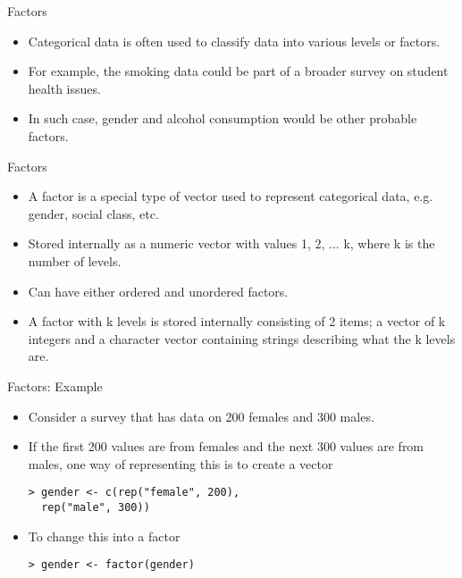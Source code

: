 \documentclass[pdf,default,slideColor,colorBG]{prosper}
\begin{document}
\begin{slide}{Factors}
\begin{itemize}
\item  Categorical data is often used to classify data into various levels or factors.
\item For example, the smoking data could be part of a broader survey on student health issues.
\item In such case, gender and alcohol consumption would be other probable factors.
\end{itemize}
\end{slide}
\begin{slide}{Factors}
\begin{itemize}
\item A factor is a special type of vector used to represent
categorical data, e.g. gender, social class, etc. \item Stored
internally as a numeric vector with values 1, 2, ... k, where k is
the number of levels. \item Can have either ordered and unordered
factors. \item A factor with k levels is stored internally
consisting of 2 items; a vector of k integers and a character
vector containing strings describing what the k levels are.
\end{itemize}
\end{slide}
\begin{slide}{Factors: Example}
\begin{itemize}
\item Consider a survey that has data on 200 females and 300
males. \item If the first 200 values are from females and the next 300
values are from males, one way of representing this is to create a
vector
\begin{verbatim}
> gender <- c(rep("female", 200),
  rep("male", 300))
\end{verbatim}
\item 
To change this into a factor
\begin{verbatim}
> gender <- factor(gender)
\end{verbatim}
\end{itemize}
\end{slide}
\end{document}

